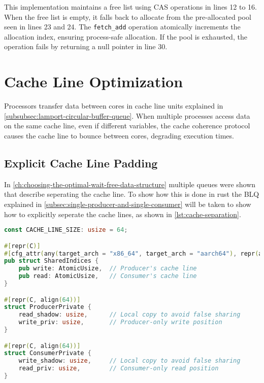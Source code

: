 This implementation maintains a free list using \ac{CAS} operations in lines 12 to 16. When the free list is empty, it falls back to allocate from the pre-allocated pool seen in lines 23 and 24. The \texttt{fetch\_add} operation atomically increments the allocation index, ensuring process-safe allocation. If the pool is exhausted, the operation fails by returning a null pointer in line 30.

\section{Cache Line Optimization}
Processors transfer data between cores in cache line units explained in \cref{subsubsec:lamport-circular-buffer-queue}. When multiple processes access data on the same cache line, even if different variables, the cache coherence protocol causes the cache line to bounce between cores, degrading execution times.

\subsection{Explicit Cache Line Padding}

In \cref{ch:choosing-the-optimal-wait-free-data-structure} multiple queues were shown that describe seperating the cache line. To show how this is done in rust the \ac{BLQ} explained in \cref{subsec:single-producer-and-single-consumer} will be taken to show how to explicitly seperate the cache lines, as shown in \cref{lst:cache-separation}.

\begin{lstlisting}[language=Rust, style=boxed, caption={Cache line separation in BlqQueue}, label={lst:cache-separation}]
const CACHE_LINE_SIZE: usize = 64;

#[repr(C)]
#[cfg_attr(any(target_arch = "x86_64", target_arch = "aarch64"), repr(align(64)))]
pub struct SharedIndices {
    pub write: AtomicUsize,  // Producer's cache line
    pub read: AtomicUsize,   // Consumer's cache line
}

#[repr(C, align(64))]
struct ProducerPrivate {
    read_shadow: usize,      // Local copy to avoid false sharing
    write_priv: usize,       // Producer-only write position
}

#[repr(C, align(64))]
struct ConsumerPrivate {
    write_shadow: usize,     // Local copy to avoid false sharing
    read_priv: usize,        // Consumer-only read position
}
\end{lstlisting}

